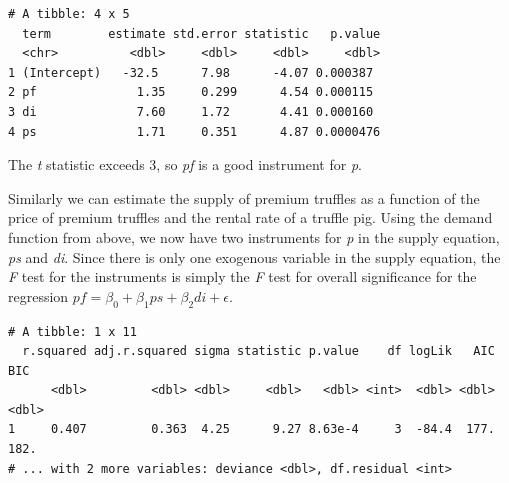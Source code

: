 \documentclass[]{book}
\newenvironment{Shaded}{\begin{snugshade}}{\end{snugshade}}
\newcommand{\KeywordTok}[1]{\textcolor[rgb]{0.13,0.29,0.53}{\textbf{#1}}}
\newcommand{\NormalTok}[1]{#1}
\newcommand{\OperatorTok}[1]{\textcolor[rgb]{0.81,0.36,0.00}{\textbf{#1}}}
\newcommand{\StringTok}[1]{\textcolor[rgb]{0.31,0.60,0.02}{#1}}
\begin{document}
\begin{Shaded}
\end{Shaded}

\begin{verbatim}
# A tibble: 4 x 5
  term        estimate std.error statistic   p.value
  <chr>          <dbl>     <dbl>     <dbl>     <dbl>
1 (Intercept)   -32.5      7.98      -4.07 0.000387 
2 pf              1.35     0.299      4.54 0.000115 
3 di              7.60     1.72       4.41 0.000160 
4 ps              1.71     0.351      4.87 0.0000476
\end{verbatim}

The \emph{t} statistic exceeds 3, so \emph{pf} is a good instrument for \emph{p}.

Similarly we can estimate the supply of premium truffles as a function of the price of premium truffles and the rental rate of a truffle pig. Using the demand function from above, we now have two instruments for \emph{p} in the supply equation, \emph{ps} and \emph{di}. Since there is only one exogenous variable in the supply equation, the \emph{F} test for the instruments is simply the \emph{F} test for overall significance for the regression \(pf = \beta_0+\beta_1ps+\beta_2di+\epsilon\).

\begin{Shaded}
\end{Shaded}

\begin{verbatim}
# A tibble: 1 x 11
  r.squared adj.r.squared sigma statistic p.value    df logLik   AIC   BIC
      <dbl>         <dbl> <dbl>     <dbl>   <dbl> <int>  <dbl> <dbl> <dbl>
1     0.407         0.363  4.25      9.27 8.63e-4     3  -84.4  177.  182.
# ... with 2 more variables: deviance <dbl>, df.residual <int>
\end{verbatim}
\end{document}
